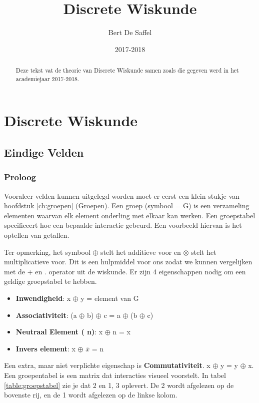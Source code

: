 \documentclass[12pt]{report}
\title{Discrete Wiskunde}
\author{Bert De Saffel}
\date{2017-2018}
\newcommand{\todo}[1] {
\color{red}\textunderscore{\textit{TODO: #1}}
\color{black}
}
\begin{document}
\maketitle
\tableofcontents

\begin{abstract}
	Deze tekst vat de theorie van Discrete Wiskunde samen zoals die gegeven werd in het academiejaar 2017-2018. 
		 
\end{abstract}


\part{Discrete Wiskunde}
\chapter{Eindige Velden}

\section{Proloog}
\todo{veel korter schrijven}
Vooraleer velden kunnen uitgelegd worden moet er eerst een klein stukje van hoofdstuk \ref{ch:groepen} (Groepen). 
Een groep (symbool = {\color{red} G}) is een verzameling elementen waarvan elk element onderling met elkaar kan werken. Een groepstabel specificeert hoe een bepaalde 
interactie gebeurd. Een voorbeeld hiervan is het optellen van getallen.


Ter opmerking, het symbool $\oplus$ stelt het additieve voor en $\otimes$ stelt het multiplicatieve voor. Dit is een hulpmiddel
voor ons zodat we kunnen vergelijken met de + en . operator uit de wiskunde.
Er zijn 4 eigenschappen nodig om een geldige groepstabel te hebben.
\begin{itemize}
	\item {\textbf{Inwendigheid}: x $\oplus$ y = element van G}
	\item {\textbf{Associativiteit}: (a $\oplus$ b) $\oplus$ c = a $\oplus$ (b $\oplus$ c)}
	\item {\textbf{Neutraal Element ({\color{red} n})}: x $\oplus$ n = x}
	\item {\textbf{Invers element}: x $\oplus$ $\overline{x}$ = {\color{red} n}}
\end{itemize}
Een extra, maar niet verplichte eigenschap is \textbf{Commutativiteit}. x $\oplus$ y = y $\oplus$ x.
Een groepentabel is een matrix dat interacties visueel voorstelt. In tabel \ref{table:groepstabel} zie je dat 2 en 1, 3 oplevert. 
De 2 wordt afgelezen op de bovenste rij, en de 1 wordt afgelezen op de linkse kolom. 
\end{document}
